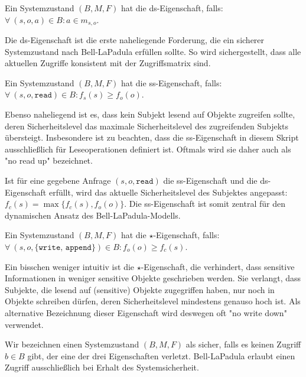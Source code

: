\begin{definition}
	Ein Systemzustand \((B, M, F)\) hat die ds-Eigenschaft, falls: \(\forall\ (s, o, a) \in B : a \in m_{s,o}\).
\end{definition}

Die ds-Eigenschaft ist die erste naheliegende Forderung, die ein sicherer Systemzustand nach Bell-LaPadula erfüllen sollte. So wird sichergestellt, dass alle aktuellen Zugriffe konsistent mit der Zugriffsmatrix sind. 

\begin{definition}
	Ein Systemzustand \((B, M, F)\) hat die ss-Eigenschaft, falls: \(\forall\ (s, o, \texttt{read}) \in B : f_s(s) \geq f_o(o)\).
\end{definition}

Ebenso naheliegend ist es, dass kein Subjekt lesend auf Objekte zugreifen sollte, deren Sicherheitslevel das maximale
Sicherheitslevel des zugreifenden Subjekts übersteigt. Insbesondere ist zu beachten, dass die ss-Eigenschaft in diesem
Skript ausschließlich für Leseoperationen definiert ist. Oftmals wird sie daher auch als "{}no read up"{} bezeichnet.

Ist für eine gegebene Anfrage \((s, o, \texttt{read})\) die ss-Eigenschaft und die ds-Eigenschaft erfüllt, wird das aktuelle Sicherheitslevel des Subjektes angepasst:
\(f_c(s) = \max \{f_c(s), f_o(o)\}\). Die ss-Eigenschaft ist somit zentral für den dynamischen Ansatz des Bell-LaPadula-Modells.

\begin{definition}
	Ein Systemzustand \((B, M, F)\) hat die \(\star\)-Eigenschaft, falls: \(\forall\ (s, o, \texttt{\{write, append\}}) \in B : f_o(o) \geq f_c(s)\).
\end{definition}

Ein bisschen weniger intuitiv ist die \(\star\)-Eigenschaft, die verhindert, dass sensitive Informationen in weniger sensitive Objekte geschrieben werden. Sie verlangt, dass Subjekte, die lesend auf (sensitive) Objekte zugegriffen haben, nur noch in Objekte schreiben dürfen, deren Sicherheitslevel mindestens genauso hoch ist. Als alternative Bezeichnung dieser Eigenschaft wird deswegen oft "{}no write down"{} verwendet.

Wir bezeichnen einen Systemzustand \((B, M, F)\) als sicher, falls es keinen Zugriff \(b \in B\) gibt, der eine der drei Eigenschaften verletzt. Bell-LaPadula erlaubt einen Zugriff ausschließlich bei Erhalt des Systemsicherheit.

